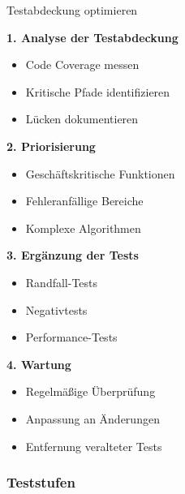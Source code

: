 \begin{KR}{Testabdeckung optimieren}\\

\begin{minipage}[t]{0.5\textwidth}
\textbf{1. Analyse der Testabdeckung}
\begin{itemize}
    \item Code Coverage messen
    \item Kritische Pfade identifizieren
    \item Lücken dokumentieren
\end{itemize}

\textbf{2. Priorisierung}
\begin{itemize}
    \item Geschäftskritische Funktionen
    \item Fehleranfällige Bereiche
    \item Komplexe Algorithmen
\end{itemize}
\end{minipage}
\begin{minipage}[t]{0.5\textwidth}
\textbf{3. Ergänzung der Tests}
\begin{itemize}
    \item Randfall-Tests
    \item Negativtests
    \item Performance-Tests
\end{itemize}

\textbf{4. Wartung}
\begin{itemize}
    \item Regelmäßige Überprüfung
    \item Anpassung an Änderungen
    \item Entfernung veralteter Tests
\end{itemize}
\end{minipage}
\end{KR}

\subsubsection{Teststufen}

